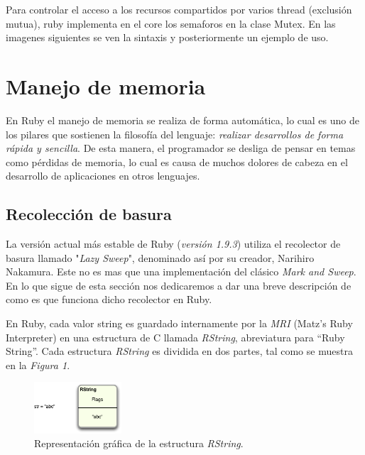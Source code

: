 \documentclass{article}
\begin{document}
Para controlar el acceso a los recursos compartidos por varios thread (exclusión mutua), ruby implementa en el core los semaforos en la clase Mutex. En las imagenes siguientes se ven la sintaxis y posteriormente un ejemplo de uso.

 
\bigskip

 
\bigskip




\section{Manejo de memoria}

	En Ruby el manejo de memoria se realiza de forma automática, lo cual es uno de los pilares que sostienen la filosofía del lenguaje: \textit{realizar desarrollos de forma rápida y sencilla}. De esta manera, el programador se desliga de pensar en temas como pérdidas de memoria, lo cual es causa de muchos dolores de cabeza en el desarrollo de aplicaciones en otros lenguajes.


\subsection{Recolección de basura}

	La versión actual más estable de Ruby (\textit{versión 1.9.3}) utiliza el recolector de basura llamado "\textit{Lazy Sweep}", denominado así por su creador, Narihiro Nakamura. Este no es mas que una implementación del clásico \textit{Mark and Sweep}. En lo que sigue de esta sección nos dedicaremos a dar una breve descripción de como es que funciona dicho recolector en Ruby.
	\par
	En Ruby, cada valor string es guardado internamente por la \textit{MRI} (Matz's Ruby Interpreter) en una estructura de C llamada \textit{RString}, abreviatura para ``Ruby String''. Cada estructura \textit{RString} es dividida en dos partes, tal como se muestra en la \textit{Figura 1}.
\bigskip

\begin{figure}[h]
	\centering
	\includegraphics[width=0.29\textwidth]{images/gc/gc01-rstring.png}
	\caption{Representación gráfica de la estructura \textit{RString}.}
\end{figure}
\bigskip
\end{document}
